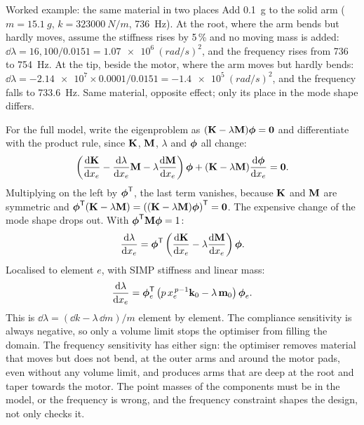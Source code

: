 \begin{theorybox}{Worked example: the same material in two places}
Add \SI{0.1}{g} to the solid arm ($m = \SI{15.1}{g}$, $k = \SI{323000}{N/m}$, \SI{736}{Hz}). At the root, where the arm bends but hardly moves, assume the stiffness rises by 5\,\% and no moving mass is added: $\dd\lambda = 16{,}100/0.0151 = \SI{1.07e6}{(rad/s)^2}$, and the frequency rises from 736 to \SI{754}{Hz}. At the tip, beside the motor, where the arm moves but hardly bends: $\dd\lambda = -\num{2.14e7} \times 0.0001/0.0151 = \SI{-1.4e5}{(rad/s)^2}$, and the frequency falls to \SI{733.6}{Hz}. Same material, opposite effect; only its place in the mode shape differs.
\end{theorybox}

For the full model, write the eigenproblem as $(\mathbf{K} - \lambda\mathbf{M})\boldsymbol{\phi} = \boldsymbol{0}$ and differentiate with the product rule, since $\mathbf{K}$, $\mathbf{M}$, $\lambda$ and $\boldsymbol{\phi}$ all change:
\begin{equation}
\left(\frac{\mathrm{d}\mathbf{K}}{\mathrm{d} x_e} - \frac{\mathrm{d}\lambda}{\mathrm{d} x_e}\mathbf{M} - \lambda\frac{\mathrm{d}\mathbf{M}}{\mathrm{d} x_e}\right)\boldsymbol{\phi} + (\mathbf{K} - \lambda\mathbf{M})\frac{\mathrm{d}\boldsymbol{\phi}}{\mathrm{d} x_e} = \boldsymbol{0}.
\end{equation}
Multiplying on the left by $\boldsymbol{\phi}^{\mathsf{T}}$, the last term vanishes, because $\mathbf{K}$ and $\mathbf{M}$ are symmetric and $\boldsymbol{\phi}^{\mathsf{T}}(\mathbf{K} - \lambda\mathbf{M}) = \left((\mathbf{K} - \lambda\mathbf{M})\boldsymbol{\phi}\right)^{\mathsf{T}} = \boldsymbol{0}$. The expensive change of the mode shape drops out. With $\boldsymbol{\phi}^{\mathsf{T}}\mathbf{M}\boldsymbol{\phi} = 1$:
\begin{equation}
\frac{\mathrm{d}\lambda}{\mathrm{d} x_e} = \boldsymbol{\phi}^{\mathsf{T}}\left(\frac{\mathrm{d}\mathbf{K}}{\mathrm{d} x_e} - \lambda\frac{\mathrm{d}\mathbf{M}}{\mathrm{d} x_e}\right)\boldsymbol{\phi}.
\end{equation}
Localised to element $e$, with SIMP stiffness and linear mass:
\begin{equation}
\frac{\mathrm{d}\lambda}{\mathrm{d} x_e} = \boldsymbol{\phi}_e^{\mathsf{T}}\left(p\, x_e^{\,p-1}\mathbf{k}_0 - \lambda\,\mathbf{m}_0\right)\boldsymbol{\phi}_e.
\end{equation}
This is $\dd\lambda = (\dd k - \lambda\,\dd m)/m$ element by element. The compliance sensitivity is always negative, so only a volume limit stops the optimiser from filling the domain. The frequency sensitivity has either sign: the optimiser removes material that moves but does not bend, at the outer arms and around the motor pads, even without any volume limit, and produces arms that are deep at the root and taper towards the motor. The point masses of the components must be in the model, or the frequency is wrong, and the frequency constraint shapes the design, not only checks it.

